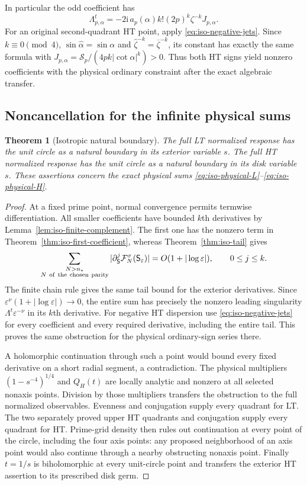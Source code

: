 \documentclass[11pt]{article}
\numberwithin{equation}{section}
\newtheorem{theorem}{Theorem}[section]
\theoremstyle{definition}
\newcommand{\ii}{\mathrm i}
\newcommand{\eps}{\varepsilon}
\begin{document}
In particular the odd coefficient has
\[
 \Lambda^t_{p,\alpha}
   =-2\ii\,a_p(\alpha)k!(2p)^k\zeta^{-k}J_{p,\alpha}.
\]
For an original second-quadrant HT point, apply
\eqref{eq:iso-negative-jets}.  Since $k\equiv0\pmod4$,
$\sin\widehat\alpha=\sin\alpha$ and
$\widehat\zeta^{-k}=\overline\zeta^{-k}$, its constant has exactly
the same formula with
$J_{p,\alpha}=\mathcal S_p/(4pk|\cot\alpha|^k)>0$.
Thus both HT signs yield nonzero coefficients with the physical
ordinary constraint after the exact algebraic transfer.

\subsection{Noncancellation for the infinite physical sums}

\begin{theorem}[Isotropic natural boundary]
\label{thm:iso-internal-boundary}
The full LT normalized response has the unit circle as a natural
boundary in its exterior variable $s$.  The full HT normalized
response has the unit circle as a natural boundary in its disk
variable $s$.  These assertions concern the exact physical sums
\eqref{eq:iso-physical-L}--\eqref{eq:iso-physical-H}.
\end{theorem}
\begin{proof}
At a fixed prime point, normal convergence permits termwise
differentiation.  All smaller coefficients have bounded $k$th
derivatives by Lemma~\ref{lem:iso-finite-complement}.
The first one has the nonzero term in
Theorem~\ref{thm:iso-first-coefficient}, whereas
Theorem~\ref{thm:iso-tail} gives
\[
 \sum_{\substack{N>n_*\\N\ {\rm of\ the\ chosen\ parity}}}
       |\partial_{\mathsf S}^{j}\mathcal F_N^\sigma(\mathsf S_\eps)|
     =O(1+|\log\eps|),\qquad 0\le j\le k.
\]
The finite chain rule gives the same tail bound for the exterior
derivatives.  Since $\eps^\nu(1+|\log\eps|)\to0$, the entire
sum has precisely the nonzero leading singularity
$\Lambda^t\eps^{-\nu}$ in its $k$th derivative.
For negative HT dispersion use \eqref{eq:iso-negative-jets} for
every coefficient and every required derivative, including the
entire tail.  This proves the same obstruction for the physical
ordinary-sign series there.

A holomorphic continuation through such a point would bound every
fixed derivative on a short radial segment, a contradiction.
The physical multipliers $(1-s^{-4})^{1/4}$ and $Q_H(t)$ are
locally analytic and nonzero at all selected nonaxis points.
Division by those multipliers transfers the obstruction to the full
normalized observables.  Evenness and conjugation supply every
quadrant for LT.  The two separately proved upper HT quadrants
and conjugation supply every quadrant for HT.  Prime-grid density
then rules out continuation at every point of the circle, including
the four axis points: any proposed neighborhood of an axis point
would also continue through a nearby obstructing nonaxis point.
Finally $t=1/s$ is biholomorphic at every unit-circle point and
transfers the exterior HT assertion to its prescribed disk germ.
\end{proof}
\end{document}
